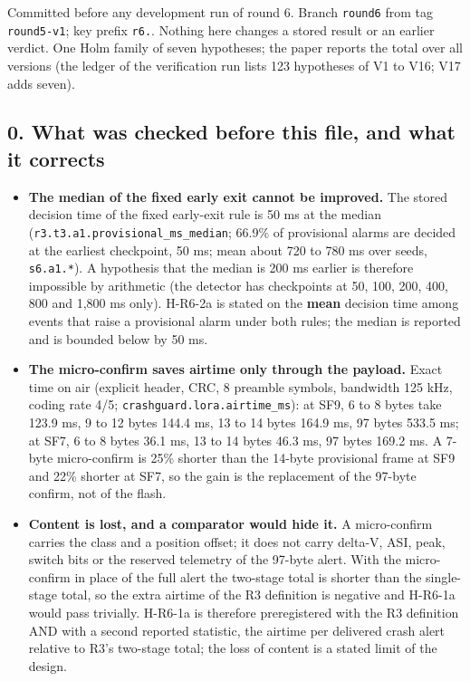 


Committed before any development run of round 6. Branch \texttt{round6} from tag \texttt{round5-v1}; key prefix \texttt{r6.}. Nothing here changes a stored result or an earlier verdict. One Holm family of seven hypotheses; the paper reports the total over all versions (the ledger of the verification run lists 123 hypotheses of V1 to V16; V17 adds seven).

\subsection*{0. What was checked before this file, and what it corrects}

\begin{itemize}
\item \textbf{The median of the fixed early exit cannot be improved.} The stored decision time of the fixed early-exit rule is 50 ms at the median (\texttt{r3.t3.a1.provisional\_ms\_median}; 66.9\% of provisional alarms are decided at the earliest checkpoint, 50 ms; mean about 720 to 780 ms over seeds, \texttt{s6.a1.*}). A hypothesis that the median is 200 ms earlier is therefore impossible by arithmetic (the detector has checkpoints at 50, 100, 200, 400, 800 and 1,800 ms only). H-R6-2a is stated on the \textbf{mean} decision time among events that raise a provisional alarm under both rules; the median is reported and is bounded below by 50 ms.
\item \textbf{The micro-confirm saves airtime only through the payload.} Exact time on air (explicit header, CRC, 8 preamble symbols, bandwidth 125 kHz, coding rate 4/5; \texttt{crashguard.lora.airtime\_ms}): at SF9, 6 to 8 bytes take 123.9 ms, 9 to 12 bytes 144.4 ms, 13 to 14 bytes 164.9 ms, 97 bytes 533.5 ms; at SF7, 6 to 8 bytes 36.1 ms, 13 to 14 bytes 46.3 ms, 97 bytes 169.2 ms. A 7-byte micro-confirm is 25\% shorter than the 14-byte provisional frame at SF9 and 22\% shorter at SF7, so the gain is the replacement of the 97-byte confirm, not of the flash.
\item \textbf{Content is lost, and a comparator would hide it.} A micro-confirm carries the class and a position offset; it does not carry delta-V, ASI, peak, switch bits or the reserved telemetry of the 97-byte alert. With the micro-confirm in place of the full alert the two-stage total is shorter than the single-stage total, so the extra airtime of the R3 definition is negative and H-R6-1a would pass trivially. H-R6-1a is therefore preregistered with the R3 definition AND with a second reported statistic, the airtime per delivered crash alert relative to R3's two-stage total; the loss of content is a stated limit of the design.

\end{itemize}
